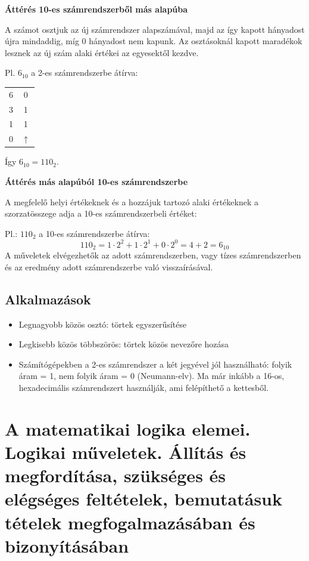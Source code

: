 \documentclass[12pt,a4paper]{article}
\begin{document}
\vspace{30px}
\textbf{Áttérés 10-es számrendszerből más alapúba}

A számot osztjuk az új számrendszer alapszámával, majd az így kapott hányadost újra mindaddig, míg 0 hányadost nem kapunk. Az osztásoknál kapott maradékok lesznek az új szám alaki értékei az egyesektől kezdve.

Pl. $6_{10}$ a 2-es számrendszerbe átírva:
\begin{table}[h!]
\centering
\begin{tabular}{c|c}
6 & 0 \\
3 & 1 \\
1 & 1 \\
0 & $\uparrow$
\end{tabular}
\end{table}

Így $6_{10} = 110_2$.

\vspace{30px}
\textbf{Áttérés más alapúból 10-es számrendszerbe}

A megfelelő helyi értékeknek és a hozzájuk tartozó alaki értékeknek a szorzatösszege adja a 10-es számrendszerbeli értéket:

Pl.: $110_2$ a 10-es számrendszerbe átírva:
$$110_2 = 1 \cdot 2^2 + 1 \cdot 2^1 + 0 \cdot 2^0 = 4 + 2 = 6_{10}$$
A műveletek elvégezhetők az adott számrendszerben, vagy tízes számrendszerben és az eredmény adott számrendszerbe való visszaírásával.

\subsection{Alkalmazások}
\begin{itemize}
\item Legnagyobb közös osztó: törtek egyszerűsítése
\item Legkisebb közös többszörös: törtek közös nevezőre hozása
\item Számítógépekben a 2-es számrendszer a két jegyével jól használható: folyik áram = 1, nem folyik áram = 0 (Neumann-elv). Ma már inkább a 16-os, hexadecimális számrendszert használják, ami felépíthető a kettesből.
\end{itemize}

\newpage


\section{A matematikai logika elemei. Logikai műveletek. Állítás és megfordítása, szükséges és elégséges feltételek, bemutatásuk tételek megfogalmazásában és bizonyításában}
\end{document}
